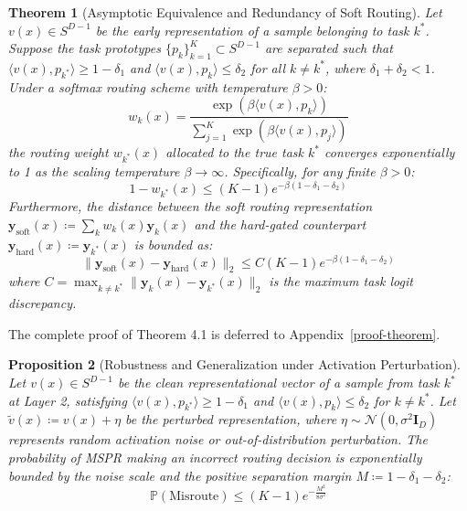 \documentclass{article}
\theoremstyle{plain}
\newtheorem{theorem}{Theorem}[section]
\newtheorem{proposition}[theorem]{Proposition}
\theoremstyle{definition}
\theoremstyle{remark}
\begin{document}
\begin{theorem}[Asymptotic Equivalence and Redundancy of Soft Routing]
Let $v(x) \in S^{D-1}$ be the early representation of a sample belonging to task $k^*$. Suppose the task prototypes $\{p_k\}_{k=1}^K \subset S^{D-1}$ are separated such that $\langle v(x), p_{k^*} \rangle \ge 1 - \delta_1$ and $\langle v(x), p_{k} \rangle \le \delta_2$ for all $k \neq k^*$, where $\delta_1 + \delta_2 < 1$. Under a softmax routing scheme with temperature $\beta > 0$:
\begin{equation}
w_k(x) = \frac{\exp(\beta \langle v(x), p_k \rangle)}{\sum_{j=1}^K \exp(\beta \langle v(x), p_j \rangle)}
\end{equation}
the routing weight $w_{k^*}(x)$ allocated to the true task $k^*$ converges exponentially to 1 as the scaling temperature $\beta \to \infty$. Specifically, for any finite $\beta > 0$:
\begin{equation}
1 - w_{k^*}(x) \le (K-1) e^{-\beta (1 - \delta_1 - \delta_2)}
\end{equation}
Furthermore, the distance between the soft routing representation $\mathbf{y}_{\text{soft}}(x) \coloneqq \sum_k w_k(x) \mathbf{y}_k(x)$ and the hard-gated counterpart $\mathbf{y}_{\text{hard}}(x) \coloneqq \mathbf{y}_{k^*}(x)$ is bounded as:
\begin{equation}
\|\mathbf{y}_{\text{soft}}(x) - \mathbf{y}_{\text{hard}}(x)\|_2 \le C (K-1) e^{-\beta (1 - \delta_1 - \delta_2)}
\end{equation}
where $C = \max_{k \neq k^*} \|\mathbf{y}_k(x) - \mathbf{y}_{k^*}(x)\|_2$ is the maximum task logit discrepancy.
\end{theorem}

The complete proof of Theorem 4.1 is deferred to Appendix~\ref{proof-theorem}.

\begin{proposition}[Robustness and Generalization under Activation Perturbation]
Let $v(x) \in S^{D-1}$ be the clean representational vector of a sample from task $k^*$ at Layer 2, satisfying $\langle v(x), p_{k^*} \rangle \ge 1 - \delta_1$ and $\langle v(x), p_k \rangle \le \delta_2$ for $k \neq k^*$. Let $\tilde{v}(x) \coloneqq v(x) + \eta$ be the perturbed representation, where $\eta \sim \mathcal{N}(0, \sigma^2 \mathbf{I}_D)$ represents random activation noise or out-of-distribution perturbation. The probability of MSPR making an incorrect routing decision is exponentially bounded by the noise scale and the positive separation margin $M \coloneqq 1 - \delta_1 - \delta_2$:
\begin{equation}
\mathbb{P}(\text{Misroute}) \le (K-1) e^{- \frac{M^2}{8 \sigma^2}}
\end{equation}
\end{proposition}
\end{document}
